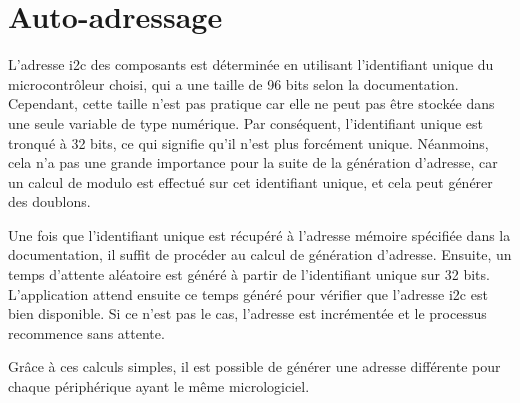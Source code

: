 \section{Auto-adressage}

L'adresse \gls{i2c} des composants est déterminée en utilisant l'identifiant unique du microcontrôleur choisi, qui a une taille de 96 bits selon la documentation.
Cependant, cette taille n'est pas pratique car elle ne peut pas être stockée dans une seule variable de type numérique.
Par conséquent, l'identifiant unique est tronqué à 32 bits, ce qui signifie qu'il n'est plus forcément unique.
Néanmoins, cela n'a pas une grande importance pour la suite de la génération d'adresse, car un calcul de modulo est effectué sur cet identifiant unique, et cela peut générer des doublons.

Une fois que l'identifiant unique est récupéré à l'adresse mémoire spécifiée dans la documentation, il suffit de procéder au calcul de génération d'adresse.
Ensuite, un temps d'attente aléatoire est généré à partir de l'identifiant unique sur 32 bits.
L'application attend ensuite ce temps généré pour vérifier que l'adresse \gls{i2c} est bien disponible.
Si ce n'est pas le cas, l'adresse est incrémentée et le processus recommence sans attente.

Grâce à ces calculs simples, il est possible de générer une adresse différente pour chaque périphérique ayant le même micrologiciel.